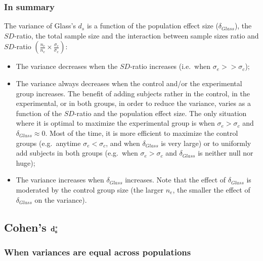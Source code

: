 \documentclass[
  english,
  man,mask]{apa6}
\providecommand{\tightlist}{%
  \setlength{\itemsep}{0pt}\setlength{\parskip}{0pt}}
\begin{document}
\hypertarget{in-summary-1}{%
\subsubsection{In summary}\label{in-summary-1}}

The variance of Glass's \(d_s\) is a function of the population effect size (\(\delta_{Glass}\)), the \(SD\)-ratio, the total sample size and the interaction between sample sizes ratio and \(SD\)-ratio \(\left(\frac{n_c}{n_e}\times\frac{\sigma_c}{\sigma_e} \right)\):

\begin{itemize}
\tightlist
\item
  The variance decreases when the \(SD\)-ratio increases (i.e.~when \(\sigma_e >> \sigma_c\));\\
\item
  The variance always decreases when the control and/or the experimental group increases. The benefit of adding subjects rather in the control, in the experimental, or in both groups, in order to reduce the variance, varies as a function of the \(SD\)-ratio and the population effect size. The only situation where it is optimal to maximize the experimental group is when \(\sigma_e > \sigma_c\) and \(\delta_{Glass} \approx 0\). Most of the time, it is more efficient to maximize the control groups (e.g.~anytime \(\sigma_e < \sigma_c\), and when \(\delta_{Glass}\) is very large) or to uniformly add subjects in both groups (e.g.~when \(\sigma_e > \sigma_c\) and \(\delta_{Glass}\) is neither null nor huge);
\item
  The variance increases when \(\delta_{Glass}\) increases. Note that the effect of \(\delta_{Glass}\) is moderated by the control group size (the larger \(n_e\), the smaller the effect of \(\delta_{Glass}\) on the variance).
\end{itemize}

\hypertarget{cohens-bf-d_s-1}{%
\subsection{\texorpdfstring{Cohen's \(\bf d^*_s\)}{Cohen's \textbackslash bf d\^{}*\_s}}\label{cohens-bf-d_s-1}}

\hypertarget{when-variances-are-equal-across-populations-2}{%
\subsubsection{When variances are equal across populations}\label{when-variances-are-equal-across-populations-2}}
\end{document}
